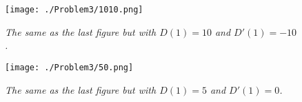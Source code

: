 \begin{figure}[H]
  \centering
  \texttt{[image: ./Problem3/1010.png]}
  \caption{\textit{The same as the last figure but with $D(1)=10$ and $D'(1)=-10$.}}
\end{figure}

\begin{figure}[H]
  \centering
  \texttt{[image: ./Problem3/50.png]}
  \caption{\textit{The same as the last figure but with $D(1)=5$ and $D'(1)=0$.}}
\end{figure}
